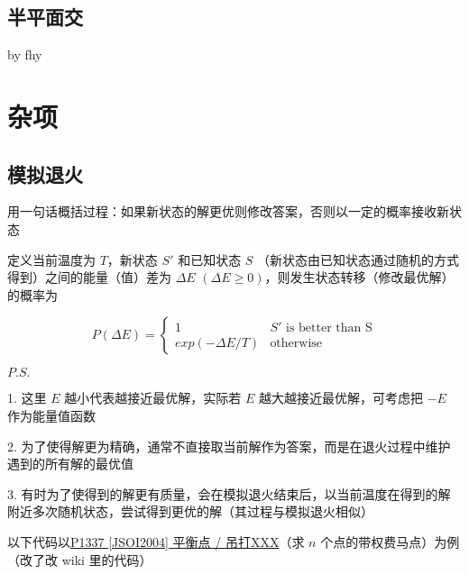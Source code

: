 \documentclass[12pt]{article}
\begin{document}


\newpage

\subsection{半平面交}

by fhy



\newpage

{\centering\section{杂项}}

\subsection{模拟退火}

    \hspace{2em} 用一句话概括过程：如果新状态的解更优则修改答案，否则以一定的概率接收新状态

    \hspace{2em} 定义当前温度为 $T$，新状态 $S'$ 和已知状态 $S$ （新状态由已知状态通过随机的方式得到）之间的能量（值）差为 $\Delta E$ $(\Delta E\ge0)$，则发生状态转移（修改最优解）的概率为

$$
P(\Delta E)=
\begin{cases}
	1 & S'\text{ is better than S}\\
	exp(-\Delta E/T) & \text{otherwise}
\end{cases}
$$

$P.S.$ 

    \hspace{2em} 1. 这里 $E$ 越小代表越接近最优解，实际若 $E$ 越大越接近最优解，可考虑把 $-E$ 作为能量值函数

    \hspace{2em} 2. 为了使得解更为精确，通常不直接取当前解作为答案，而是在退火过程中维护遇到的所有解的最优值

    \hspace{2em} 3. 有时为了使得到的解更有质量，会在模拟退火结束后，以当前温度在得到的解附近多次随机状态，尝试得到更优的解（其过程与模拟退火相似）

    \hspace{2em} 以下代码以\href{https://www.luogu.com.cn/problem/P1337}{P1337 [JSOI2004] 平衡点 / 吊打XXX}（求 $n$ 个点的带权费马点）为例（改了改 wiki 里的代码）
\end{document}
